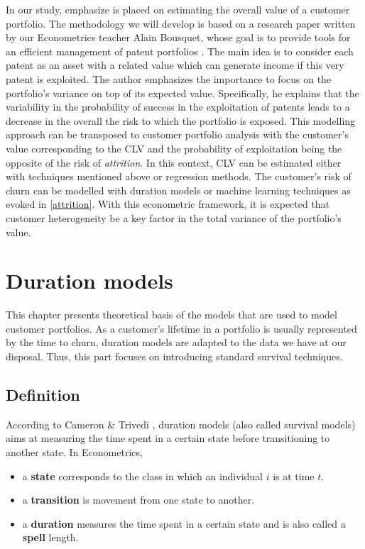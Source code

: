 \documentclass[
]{book}
\providecommand{\tightlist}{%
  \setlength{\itemsep}{0pt}\setlength{\parskip}{0pt}}
\begin{document}
In our study, emphasize is placed on estimating the overall value of a customer portfolio. The methodology we will develop is based on a research paper written by our Econometrics teacher Alain Bousquet, whose goal is to provide tools for an efficient management of patent portfolios \citep{BREVETS}. The main idea is to consider each patent as an asset with a related value which can generate income if this very patent is exploited. The author emphasizes the importance to focus on the portfolio's variance on top of its expected value. Specifically, he explains that the variability in the probability of success in the exploitation of patents leads to a decrease in the overall the risk to which the portfolio is exposed. This modelling approach can be transposed to customer portfolio analysis with the customer's value corresponding to the CLV and the probability of exploitation being the opposite of the risk of \emph{attrition}. In this context, CLV can be estimated either with techniques mentioned above or regression methods. The customer's risk of churn can be modelled with duration models or machine learning techniques as evoked in \ref{attrition}. With this econometric framework, it is expected that customer heterogeneity be a key factor in the total variance of the portfolio's value.

\hypertarget{duration}{%
\chapter{Duration models}\label{duration}}

This chapter presents theoretical basis of the models that are used to model customer portfolios. As a customer's lifetime in a portfolio is usually represented by the time to churn, duration models are adapted to the data we have at our disposal. Thus, this part focuses on introducing standard survival techniques.

\hypertarget{definition}{%
\section{Definition}\label{definition}}

According to Cameron \& Trivedi \citep{CAMERON_TRIVEDI}, duration models (also called survival models) aims at measuring the time spent in a certain state before transitioning to another state. In Econometrics,

\begin{itemize}
\tightlist
\item
  a \textbf{state} corresponds to the class in which an individual \(i\) is at time \(t\).
\item
  a \textbf{transition} is movement from one state to another.
\item
  a \textbf{duration} measures the time spent in a certain state and is also called a \textbf{spell} length.
\end{itemize}
\end{document}
